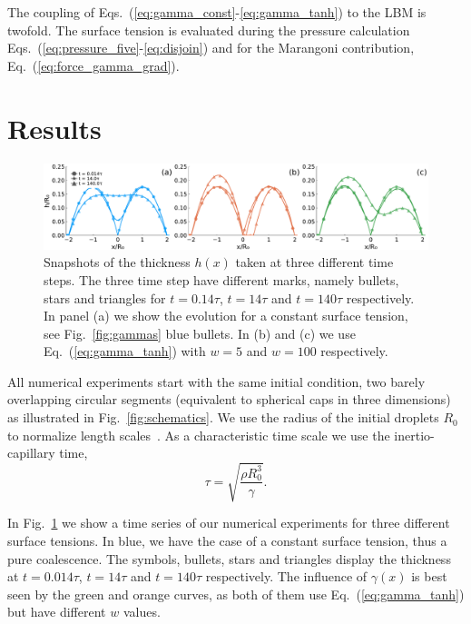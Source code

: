 The coupling of Eqs.~(\ref{eq:gamma_const}-\ref{eq:gamma_tanh}) to the LBM is twofold.
The surface tension is evaluated during the pressure calculation Eqs.~(\ref{eq:pressure_five}-\ref{eq:disjoin}) and for the Marangoni contribution, Eq.~(\ref{eq:force_gamma_grad}).

\section{Results}\label{sec:results_five}
\begin{figure}
    \centering
    \includegraphics[width=1.0\textwidth]{graphics/height_three_times_three_gamma.pdf}
    \caption{Snapshots of the thickness $h(x)$ taken at three different time steps.
    The three time step have different marks, namely bullets, stars and triangles for $t=0.14\tau$, $t=14\tau$ and $t=140\tau$ respectively.
    In panel (a) we show the evolution for a constant surface tension, see Fig.~\ref{fig:gammas} blue bullets.
    In (b) and (c) we use Eq.~(\ref{eq:gamma_tanh}) with $w =5$ and $w=100$ respectively. 
    }
    \label{fig:final_state}
\end{figure}
All numerical experiments start with the same initial condition, two barely overlapping circular segments (equivalent to spherical caps in three dimensions) as illustrated in Fig.~\ref{fig:schematics}.
We use the radius of the initial droplets $R_0$ to normalize length scales~\cite{eddiInfluenceDropletGeometry2013, aartsHydrodynamicsDropletCoalescence2005}.
As a characteristic time scale we use the inertio-capillary time, 
\begin{equation}\label{eq:inertio-cap-time}
    \tau = \sqrt{\frac{\rho R_0^3}{\gamma}}.
\end{equation}

In Fig.~\ref{fig:final_state} we show a time series of our numerical experiments for three different surface tensions.
In blue, we have the case of a constant surface tension, thus a pure coalescence.
The symbols, bullets, stars and triangles display the thickness at $t=0.014\tau$, $t=14\tau$ and $t=140\tau$ respectively. 
The influence of $\gamma(x)$ is best seen by the green and orange curves, as both of them use Eq.~(\ref{eq:gamma_tanh}) but have different $w$ values.

